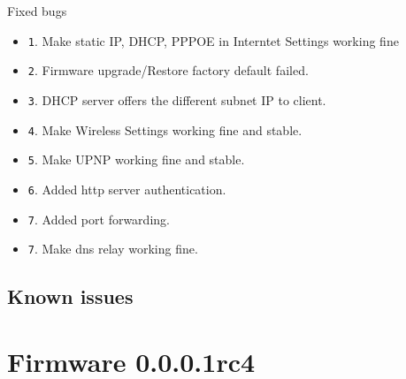 \documentclass[12pt]{report}
\newcommand{\tlabel}[1]{
  \label{#1}%
  }
\begin{document}
\begin{itemize}
\begin{enumerate}
\begin{itemize}
\end{itemize}
  Fixed bugs 
  \begin{itemize}
  \item \texttt1. Make static IP, DHCP, PPPOE in Interntet Settings working fine
  \item \texttt2. Firmware upgrade/Restore factory default failed.
  \item \texttt3. DHCP server offers the different subnet IP to client.
  \item \texttt4. Make Wireless Settings working fine and stable.
  \item \texttt5. Make UPNP working fine and stable.
  \item \texttt6. Added http server authentication.
  \item \texttt7. Added port forwarding.
  \item \texttt7. Make dns relay working fine.
  \end{itemize}
\end{enumerate}
\end{itemize}

\subsection{Known issues}

\begin{enumerate}

\end{enumerate}

\section{Firmware 0.0.0.1rc4}
\tlabel{sec:0.0.0.1rc4}
\end{document}
